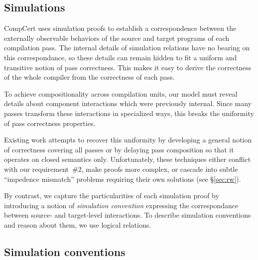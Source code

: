 \documentclass[draft,11pt]{report}
\begin{document}


\subsection{Simulations} %

CompCert uses simulation proofs
to establish a correspondence between
the externally observable behaviors of
the source and target programs of each compilation pass.
The internal details of simulation relations
have no bearing on this correspondance,
so these details can remain hidden
to fit a uniform and transitive notion of pass correctness.
This makes it easy to derive the correctness
of the whole compiler
from the correctness of each pass.

To achieve compositionality across compilation units,
our model must reveal details
about component interactions
which were previously internal.
Since many passes transform
these interactions in
specialized ways,
this breaks the uniformity
of pass correctness properties.

Existing work attempts to recover this uniformity
by developing a general notion of correctness
covering all passes
or by delaying pass composition so that
it operates on closed semantics only.
Unfortunately, these techniques either
conflict with our requirement~\#2,
make proofs more complex,
or cascade into subtle ``impedence mismatch'' problems
requiring their own solutions
(see \S\ref{sec:rw}).

By contrast,
we capture the particularities of each simulation proof
by introducing a notion of \emph{simulation convention}
expressing the correspondance between
source- and target-level interactions.
To describe simulation conventions
and reason about them,
we use logical relations.



\subsection{Simulation conventions} \label{sec:simconv} %
\end{document}
